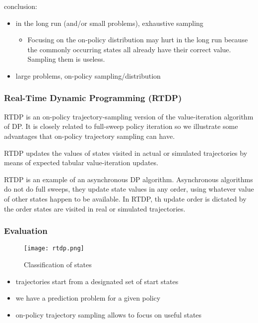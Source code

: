 \documentclass[sutton_barto_notes.tex]{subfiles}
\begin{document}
conclusion:
\begin{itemize}
\item in the long run (and/or small problems), exhaustive sampling
\begin{itemize}
	\item Focusing on the on-policy distribution may hurt in the long run because the commonly occurring states all already have their correct value. Sampling them is useless.
\end{itemize}
\item large problems, on-policy sampling/distribution
\end{itemize}

\subsubsection{Real-Time Dynamic Programming (RTDP)}

RTDP is an on-policy trajectory-sampling version of the value-iteration algorithm of DP. It is closely related to full-sweep policy iteration so we illustrate some advantages that on-policy trajectory sampling can have.

RTDP updates the values of states visited in actual or simulated trajectories by means of expected tabular value-iteration updates.

RTDP is an example of an asynchronous DP algorithm. Asynchronous algorithms do not do full sweeps, they update state values in any order, using whatever value of other states happen to be available. In RTDP, th update order is dictated by the order states are visited in real or simulated trajectories.

\subsubsection{Evaluation}

\begin{figure}[h!]
    \centering
    \texttt{[image: rtdp.png]}
    \caption{ Classification of states }
\end{figure}

\begin{itemize}
\item trajectories start from a designated set of start states
\item we have a prediction problem for a given policy
\item on-policy trajectory sampling allows to focus on useful states
\end{itemize}
\end{document}
